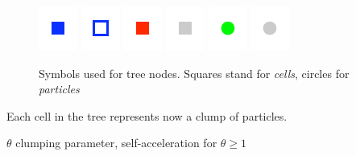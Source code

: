 \begin{figure}[htbp]
\begin{center}
\includegraphics{ttnode_filled_local.pdf}
\includegraphics{ttnode_empty_local.pdf}
\includegraphics{node_filled_local.pdf}
\includegraphics{node_filled_remote.pdf}
\hspace{1cm}
\includegraphics{particle_filled_local.pdf}
\includegraphics{particle_filled_remote.pdf}
\caption{Symbols used for tree nodes. Squares stand for \emph{cells}, circles for \emph{particles}}
\label{fig:nodetypes}
\end{center}
\end{figure}


Each cell in the tree represents now a clump of particles. 

$\theta$ clumping parameter, self-acceleration for $\theta \ge 1$
